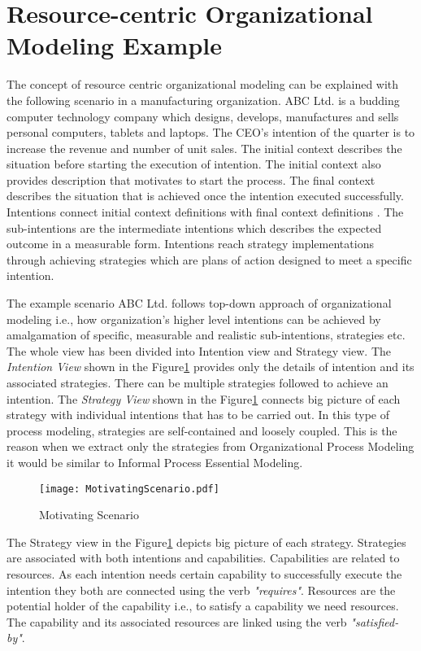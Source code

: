 \section{Resource-centric Organizational Modeling Example}
\label{sec:scenario}
 The concept of resource centric organizational modeling can be explained with the following scenario in a manufacturing organization. ABC Ltd. is a budding computer technology company which designs, develops, manufactures and sells personal computers, tablets and laptops. The CEO's intention of the quarter is to increase the revenue and number of unit sales. The initial context describes the situation before starting the execution of intention. The initial context also provides description that motivates to start the process. The final context describes the situation that is achieved once the intention executed successfully. Intentions connect initial context definitions with final context definitions \cite{Sungur2014a}. The sub-intentions are the intermediate intentions which describes the expected outcome in a measurable form. Intentions reach strategy implementations through achieving strategies which are plans of action designed to meet a specific intention. 

 The example scenario ABC Ltd. follows top-down approach of organizational modeling i.e., how organization's higher level intentions can be achieved by amalgamation of specific, measurable and realistic sub-intentions, strategies etc. The whole view has been divided into Intention view and Strategy view. The \textit{Intention View} shown in the Figure\ref{fig:motivatingscenario} provides only the details of intention and its associated strategies. There can be multiple strategies followed to achieve an intention. The \textit{Strategy View} shown in the Figure\ref{fig:motivatingscenario} connects big picture of each strategy with individual intentions that has to be carried out. In this type of process modeling, strategies are self-contained and loosely coupled. This is the reason when we extract only the strategies from Organizational Process Modeling it would be similar to Informal Process Essential Modeling. 
 
 \begin{figure}
 	\centering
 	\texttt{[image: MotivatingScenario.pdf]}
 	\caption{Motivating Scenario}
 	\label{fig:motivatingscenario}
 \end{figure}

 The Strategy view  in the Figure\ref{fig:motivatingscenario} depicts big picture of each strategy. Strategies are associated with both intentions and capabilities. Capabilities are related to resources. As each intention needs certain capability to successfully execute the intention they both are connected using the verb \textit{"requires"}. Resources are the potential holder of the capability i.e., to satisfy a capability we need resources. The capability and its associated resources are linked using the verb \textit{"satisfied-by"}. 






